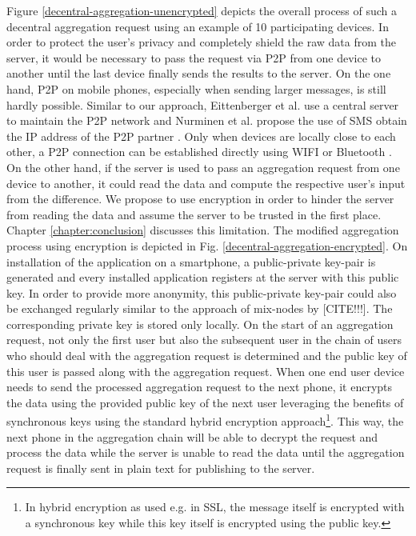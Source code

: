 Figure \ref{decentral-aggregation-unencrypted} depicts the overall process of such a decentral aggregation request using an example of 10 participating devices.
In order to protect the user's privacy and completely shield the raw data from the server, it would be necessary to pass the request via P2P from one device to another until the last device finally sends the results to the server. On the one hand, P2P on mobile phones, especially when sending larger messages, is still hardly possible. Similar to our approach, Eittenberger et al. \parencite{eittenberger2012rapidstream} use a central server to maintain the P2P network and Nurminen et al. propose the use of SMS obtain the IP address of the P2P partner \parencite{nurminen2006p2p}. Only when devices are locally close to each other, a P2P connection can be established directly using WIFI or Bluetooth \parencite{p2p-android}. On the other hand, if the server is used to pass an aggregation request from one device to another, it could read the data and compute the respective user's input from the difference. We propose to use encryption in order to hinder the server from reading the data and assume the server to be trusted in the first place. Chapter \ref{chapter:conclusion} discusses this limitation. The modified aggregation process using encryption is depicted in Fig. \ref{decentral-aggregation-encrypted}. On installation of the application on a smartphone, a public-private key-pair is generated and every installed application registers at the server with this public key. In order to provide more anonymity, this public-private key-pair could also be exchanged regularly similar to the approach of mix-nodes by [CITE!!!]. The corresponding private key is stored only locally. On the start of an aggregation request, not only the first user but also the subsequent user in the chain of users who should deal with the aggregation request is determined and the public key of this user is passed along with the aggregation request. When one end user device needs to send the processed aggregation request to the next phone, it encrypts the data using the provided public key of the next user leveraging the benefits of synchronous keys using the standard hybrid encryption approach\footnote{In hybrid encryption as used e.g. in SSL, the message itself is encrypted with a synchronous key while this key itself is encrypted using the public key.}. This way, the next phone in the aggregation chain will be able to decrypt the request and process the data while the server is unable to read the data until the aggregation request is finally sent in plain text for publishing to the server. 

